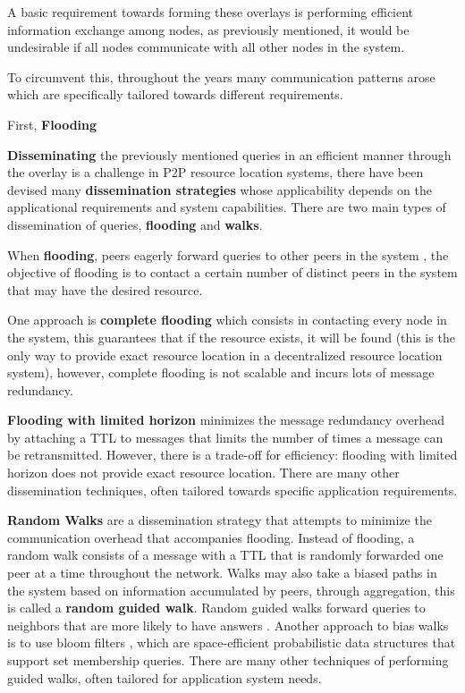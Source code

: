 A basic requirement towards forming these overlays is performing efficient information exchange among nodes, as previously mentioned, it would be undesirable if all nodes communicate with all other nodes in the system.

To circumvent this, throughout the years many communication patterns arose which are specifically tailored towards different requirements.

First, \textbf{Flooding}

\textbf{Disseminating} the previously mentioned queries in an efficient manner through the overlay is a challenge in P2P resource location systems, there have been devised many \textbf{dissemination strategies} whose applicability depends on the applicational requirements and system capabilities. There are two main types of dissemination of queries, \textbf{flooding} and \textbf{walks}.

When \textbf{flooding}, peers eagerly forward queries to other peers in the system , the objective of flooding is to contact a certain number of distinct peers in the system that may have the desired resource.

One approach is \textbf{complete flooding} which consists in contacting every node in the system, this guarantees that if the resource exists, it will be found (this is the only way to provide exact resource location in a decentralized resource location system), however, complete flooding is not scalable and incurs lots of message redundancy. 

\textbf{Flooding with limited horizon} minimizes the message redundancy overhead by attaching a TTL to messages that limits the number of times a message can be retransmitted. However, there is a trade-off for efficiency: flooding with limited horizon does not provide exact resource location. There are many other dissemination techniques, often tailored towards specific application requirements.

\textbf{Random Walks} are a dissemination strategy that attempts to minimize the communication overhead that accompanies flooding. Instead of flooding, a random walk consists of a message with a TTL that is randomly forwarded one peer at a time throughout the network. Walks may also take a biased paths in the system based on information accumulated by peers, through aggregation, this is called a \textbf{random guided walk}. Random guided walks  forward queries to neighbors that are more likely to have answers \cite{1022239}. Another approach to bias walks is to use bloom filters \cite{5751342}, which are space-efficient probabilistic data structures that support set membership queries. There are many other techniques of performing guided walks, often tailored for application system needs.

